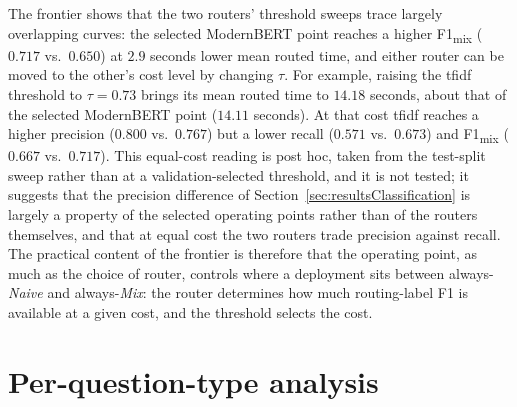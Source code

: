 \documentclass[english, bibtex]{kththesis}               %
\numberwithin{listing}{chapter}
\begin{document}
The frontier shows that the two routers' threshold sweeps trace largely overlapping curves: the selected ModernBERT point reaches a higher F1\textsubscript{mix} ($0.717$ vs.\ $0.650$) at $2.9$ seconds lower mean routed time, and either router can be moved to the other's cost level by changing $\tau$. For example, raising the \gls{tfidf} threshold to $\tau = 0.73$ brings its mean routed time to $14.18$ seconds, about that of the selected ModernBERT point ($14.11$ seconds). At that cost \gls{tfidf} reaches a higher precision ($0.800$ vs.\ $0.767$) but a lower recall ($0.571$ vs.\ $0.673$) and F1\textsubscript{mix} ($0.667$ vs.\ $0.717$). This equal-cost reading is post hoc, taken from the test-split sweep rather than at a validation-selected threshold, and it is not tested; it suggests that the precision difference of Section~\ref{sec:resultsClassification} is largely a property of the selected operating points rather than of the routers themselves, and that at equal cost the two routers trade precision against recall. The practical content of the frontier is therefore that the operating point, as much as the choice of router, controls where a deployment sits between always-\emph{Naive} and always-\emph{Mix}: the router determines how much routing-label F1 is available at a given cost, and the threshold selects the cost.

\section{Per-question-type analysis}
\label{sec:resultsPerType}
\end{document}
